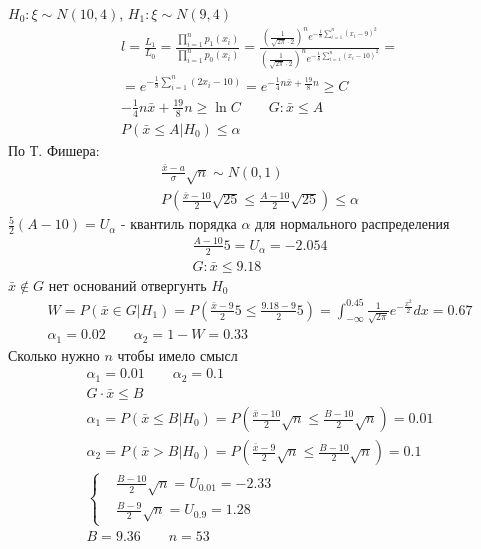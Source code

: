 \documentclass{article}
\begin{document}
\begin{eg}
  $H_0: \xi  \sim N(10, 4)$, $H_1: \xi \sim N(9, 4)$
  \begin{gather*}
    l = \frac{L_1}{L_0}=\frac{\prod_{i=1}^{n}p_1(x_i)}{\prod_{i=1}^{n}p_0(x_i)}
    = \frac{\left(\frac{1}{\sqrt{2\pi}\cdot2}\right)^{n}e^{-\frac{1}{8}\sum_{i=1}^{n}(x_i-9)^{2}}}{\left(\frac{1}{\sqrt{2\pi}\cdot2}\right)^{n}e^{-\frac{1}{8}\sum_{i=1}^{n}(x_i-10)^{2}}} =\\
    = e^{-\frac{1}{8}\sum_{i=1}^{n}(2x_i-10)}=e^{-\frac{1}{4}n\bar{x}+\frac{19}{8}n} \ge C \\ 
    -\frac{1}{4}n \bar{x}+\frac{19}{8}n \ge \ln C \qquad G:\bar{x} \le A \\ 
    P(\bar{x} \le A | H_0) \le \alpha
  \end{gather*}
  По Т. Фишера:
  \begin{gather*}
    \frac{\bar{x}-a}{\sigma}\sqrt{n} \sim N(0,1) \\ 
    P(\frac{\bar{x}-10}{2}\sqrt{25}\le \frac{A-10}{2}\sqrt{25}) \le \alpha
  \end{gather*}
  $\frac{5}{2}(A-10)=U_{\alpha}$ - квантиль порядка $\alpha$ для нормального распределения
  \begin{gather*}
    \frac{A-10}{2}5=U_{\alpha}=-2.054 \\ 
    G: \bar{x} \le 9.18
  \end{gather*}
  $\bar{x} \not \in G$ нет оснований отвергунть $H_0$
  \begin{gather*}
    W=P(\bar{x}\in G | H_1)=P(\frac{\bar{x}-9}{2}5 \le \frac{9.18-9}{2}5)
    =\int_{-\infty}^{0.45}\frac{1}{\sqrt{2\pi}}e^{-\frac{x^{2}}{2}}dx=0.67 \\ 
    \alpha_1=0.02 \qquad \alpha_2=1-W=0.33
  \end{gather*}
  Сколько нужно $n$ чтобы имело смысл
  \begin{gather*}
    \alpha_1=0.01 \qquad \alpha_2=0.1 \\ 
    G\cdot \bar{x} \le B \\ 
    \alpha_1=P(\bar{x}\le B | H_0) = P(\frac{\bar{x}-10}{2}\sqrt{n} \le \frac{B-10}{2}\sqrt{n})=0.01 \\
    \alpha_2=P(\bar{x}> B | H_0) = P(\frac{\bar{x}-9}{2}\sqrt{n} \le \frac{B-10}{2}\sqrt{n})=0.1 \\
    \left\{\begin{aligned}
      & \frac{B-10}{2}\sqrt{n}=U_{0.01}=-2.33\\
      & \frac{B-9}{2}\sqrt{n}=U_{0.9}=1.28
    \end{aligned}\right. \\ 
    B=9.36 \qquad n=53
  \end{gather*}
\end{eg}
\end{document}
